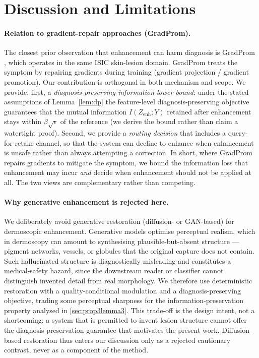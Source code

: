 \section{Discussion and Limitations}\label{sec:discussion}

\paragraph{Relation to gradient-repair approaches (GradProm).}
The closest prior observation that enhancement can harm diagnosis is GradProm
\citep{gradprom2025}, which operates in the same ISIC skin-lesion domain. GradProm
treats the symptom by repairing gradients during training (gradient projection /
gradient promotion). Our contribution is orthogonal in both mechanism and scope. We
provide, first, a \emph{diagnosis-preserving information lower bound}: under the stated
assumptions of Lemma~\ref{lem:dp} the feature-level diagnosis-preserving objective
guarantees that the mutual information $I(Z_{\mathrm{enh}};Y)$ retained after
enhancement stays within $\beta\sqrt{\epsilon}$ of the reference (we derive the bound
rather than claim a watertight proof). Second, we provide a \emph{routing decision}
that includes a query-for-retake channel, so that the system can decline to enhance
when enhancement is unsafe rather than always attempting a correction. In short, where
GradProm repairs gradients to mitigate the symptom, we bound the information loss that
enhancement may incur \emph{and} decide when enhancement should not be applied at all.
The two views are complementary rather than competing.

\paragraph{Why generative enhancement is rejected here.}
We deliberately avoid generative restoration (diffusion- or GAN-based) for dermoscopic
enhancement. Generative models optimise perceptual realism, which in dermoscopy can
amount to synthesising plausible-but-absent structure --- pigment networks, vessels, or
globules that the original capture does not contain. Such hallucinated structure is
diagnostically misleading and constitutes a medical-safety hazard, since the
downstream reader or classifier cannot distinguish invented detail from real
morphology. We therefore use deterministic restoration with a quality-conditional
modulation and a diagnosis-preserving objective, trading some perceptual sharpness for
the information-preservation property analysed in \cref{sec:prop3lemma3}. This
trade-off is the design intent, not a shortcoming: a system that is permitted to
invent lesion structure cannot offer the diagnosis-preservation guarantee that
motivates the present work. Diffusion-based restoration thus enters our discussion
only as a rejected cautionary contrast, never as a component of the method.


